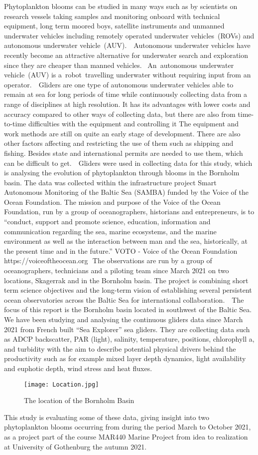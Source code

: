 \documentclass[../Main.tex]{subfiles}
\begin{document}
Phytoplankton blooms can be studied in many ways such as by scientists on research vessels taking samples and monitoring onboard with technical equipment, long term moored boys, satellite instruments and unmanned underwater vehicles including remotely operated underwater vehicles (ROVs) and autonomous underwater vehicle (AUV).    Autonomous underwater vehicles have recently become an attractive alternative for underwater search and exploration since they are cheaper than manned vehicles.  An autonomous underwater vehicle (AUV) is a robot travelling underwater without requiring input from an operator.   Gliders are one type of autonomous underwater vehicles able to remain at sea for long periods of time while continuously collecting data from a range of disciplines at high resolution. It has its advantages with lower costs and accuracy compared to other ways of collecting data, but there are also from time-to-time difficulties with the equipment and controlling it The equipment and work methods are still on quite an early stage of development. There are also other factors affecting and restricting the use of them such as shipping and fishing. Besides state and international permits are needed to use them, which can be difficult to get.   Gliders were used in collecting data for this study, which is analysing the evolution of phytoplankton through blooms in the Bornholm basin. The data was collected within the infrastructure project Smart Autonomous Monitoring of the Baltic Sea (SAMBA) funded by the Voice of the Ocean Foundation. 
The mission and purpose of the Voice of the Ocean Foundation, run by a group of oceanographers, historians and entrepreneurs, is to “conduct, support and promote science, education, information and communication regarding the sea, marine ecosystems, and the marine environment as well as the interaction between man and the sea, historically, at the present time and in the future.”\supercite{VOTO2021} VOTO - Voice of the Ocean Foundation https://voiceoftheocean.org  The observations are run by a group of oceanographers, technicians and a piloting team since March 2021 on two locations, Skagerrak and in the Bornholm basin. The project is combining short term science objectives and the long-term vision of establishing several persistent ocean observatories across the Baltic Sea for international collaboration.   The focus of this report is the Bornholm basin located in southwest of the Baltic Sea. We have been studying and analysing the continuous gliders data since March 2021 from French built “Sea Explorer” sea gliders. They are collecting data such as ADCP backscatter, PAR (light), salinity, temperature, positions, chlorophyll a, and turbidity with the aim to describe potential physical drivers behind the productivity such as for example mixed layer depth dynamics, light availability and euphotic depth, wind stress and heat fluxes. 
\begin{figure}[H]
\texttt{[image: Location.jpg]}
\caption{The location of the Bornholm Basin}
\end{figure}
This study is evaluating some of these data, giving insight into two phytoplankton blooms occurring from during the period March to October 2021, as a project part of the course MAR440 Marine Project from idea to realization at University of Gothenburg the autumn 2021. 
\end{document}
